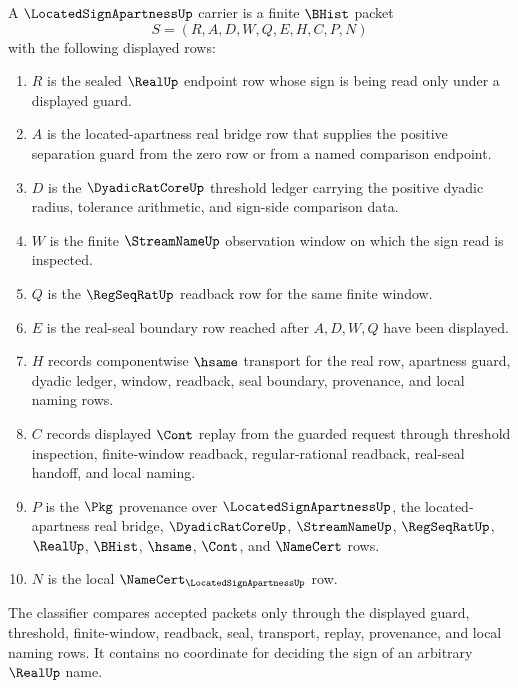 \begin{definition}
\label{def:located-sign-apartness-carrier}
A $\LocatedSignApartnessUp$ carrier is a finite $\BHist$ packet
$$
S=(R,A,D,W,Q,E,H,C,P,N)
$$
with the following displayed rows:
\begin{enumerate}
\item $R$ is the sealed $\RealUp$ endpoint row whose sign is being read only under a displayed guard.
\item $A$ is the located-apartness real bridge row that supplies the positive separation guard from the zero row or from a named comparison endpoint.
\item $D$ is the $\DyadicRatCoreUp$ threshold ledger carrying the positive dyadic radius, tolerance arithmetic, and sign-side comparison data.
\item $W$ is the finite $\StreamNameUp$ observation window on which the sign read is inspected.
\item $Q$ is the $\RegSeqRatUp$ readback row for the same finite window.
\item $E$ is the real-seal boundary row reached after $A,D,W,Q$ have been displayed.
\item $H$ records componentwise $\hsame$ transport for the real row, apartness guard, dyadic ledger, window, readback, seal boundary, provenance, and local naming rows.
\item $C$ records displayed $\Cont$ replay from the guarded request through threshold inspection, finite-window readback, regular-rational readback, real-seal handoff, and local naming.
\item $P$ is the $\Pkg$ provenance over $\LocatedSignApartnessUp$, the located-apartness real bridge, $\DyadicRatCoreUp$, $\StreamNameUp$, $\RegSeqRatUp$, $\RealUp$, $\BHist$, $\hsame$, $\Cont$, and $\NameCert$ rows.
\item $N$ is the local $\NameCert_{\LocatedSignApartnessUp}$ row.
\end{enumerate}
The classifier compares accepted packets only through the displayed guard, threshold, finite-window, readback, seal, transport, replay, provenance, and local naming rows. It contains no coordinate for deciding the sign of an arbitrary $\RealUp$ name.
\end{definition}

